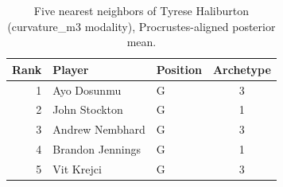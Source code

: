\begin{table}[htbp]
  \centering\small
  \begin{tabular}{rllc}
    \toprule
    Rank & Player & Position & Archetype \\
    \midrule
    1 & Ayo Dosunmu & G & 3 \\
    2 & John Stockton & G & 1 \\
    3 & Andrew Nembhard & G & 3 \\
    4 & Brandon Jennings & G & 1 \\
    5 & Vit Krejci & G & 3 \\
    \bottomrule
  \end{tabular}
  \caption{Five nearest neighbors of Tyrese Haliburton (curvature_m3 modality), Procrustes-aligned posterior mean.}
  \label{tab:Tyrese_Haliburton_neighbors_curvature_m3}
\end{table}


